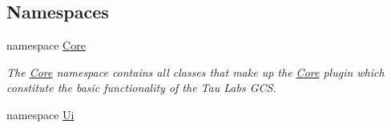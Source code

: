 \subsection*{\-Namespaces}
\begin{DoxyCompactItemize}
\item 
namespace \hyperlink{namespace_core}{\-Core}
\begin{DoxyCompactList}\small\item\em \-The \hyperlink{namespace_core}{\-Core} namespace contains all classes that make up the \hyperlink{namespace_core}{\-Core} plugin which constitute the basic functionality of the \-Tau \-Labs \-G\-C\-S. \end{DoxyCompactList}\item 
namespace \hyperlink{namespace_ui}{\-Ui}
\end{DoxyCompactItemize}
